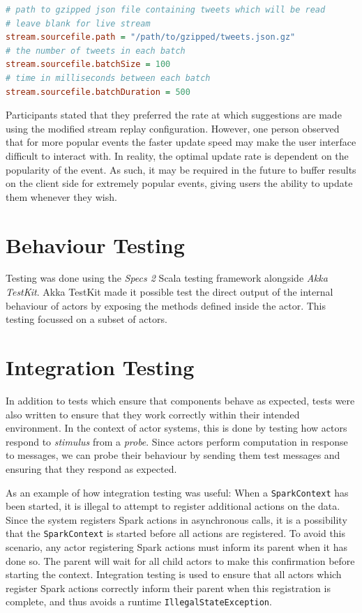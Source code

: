 \documentclass{l4proj}
\newcommand{\code}[1]{\texttt{#1}}
\begin{document}
\begin{lstlisting}[caption=Configuration of the stream replay rate in application.conf,language=Ini]
# path to gzipped json file containing tweets which will be read
# leave blank for live stream
stream.sourcefile.path = "/path/to/gzipped/tweets.json.gz"
# the number of tweets in each batch
stream.sourcefile.batchSize = 100
# time in milliseconds between each batch
stream.sourcefile.batchDuration = 500
\end{lstlisting}

Participants stated that they preferred the rate at which suggestions are made using the modified stream replay configuration. However, one person observed that for more popular events the faster update speed may make the user interface difficult to interact with. In reality, the optimal update rate is dependent on the popularity of the event. As such, it may be required in the future to buffer results on the client side for extremely popular events, giving users the ability to update them whenever they wish.

\section{Behaviour Testing}

    Testing was done using the \textit{Specs 2} Scala testing framework alongside \textit{Akka TestKit}. Akka TestKit made it possible test the direct output of the internal behaviour of actors by exposing the methods defined inside the actor. This testing focussed on a subset of actors.
        
\section{Integration Testing}
    In addition to tests which ensure that components behave as expected, tests were also written to ensure that they work correctly within their intended environment. In the context of actor systems, this is done by testing how actors respond to \textit{stimulus} from a \textit{probe}. Since actors perform computation in response to messages, we can probe their behaviour by sending them test messages and ensuring that they respond as expected.
    
    As an example of how integration testing was useful: When a \code{SparkContext} has been started, it is illegal to attempt to register additional actions on the data. Since the system registers Spark actions in asynchronous calls, it is a possibility that the \code{SparkContext} is started before all actions are registered. To avoid this scenario, any actor registering Spark actions must inform its parent when it has done so. The parent will wait for all child actors to make this confirmation before starting the context. Integration testing is used to ensure that all actors which register Spark actions correctly inform their parent when this registration is complete, and thus avoids a runtime \code{IllegalStateException}.   
\end{document}
